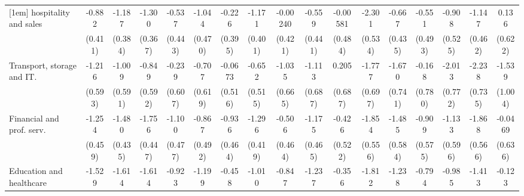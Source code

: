 {\begin{tabular}{l*{16}{c}}
[1em]
hospitality and sales&      -0.882\sym{*}  &      -1.187\sym{**} &      -1.300\sym{***}&      -0.537         &      -1.044\sym{*}  &      -0.226         &      -1.171\sym{**} &    -0.00240         &      -0.559         &    -0.00581         &      -2.301\sym{***}&      -0.667         &      -0.551         &      -0.908         &      -1.147\sym{*}  &       0.136         \\
                    &     (0.411)         &     (0.384)         &     (0.367)         &     (0.443)         &     (0.470)         &     (0.395)         &     (0.401)         &     (0.421)         &     (0.441)         &     (0.484)         &     (0.534)         &     (0.435)         &     (0.493)         &     (0.525)         &     (0.462)         &     (0.622)         \\
[1em]
Transport, storage and IT.&      -1.216\sym{*}  &      -1.009         &      -0.849         &      -0.239         &      -0.707         &     -0.0673         &      -0.652         &      -1.035         &      -1.113         &       0.205         &      -1.777\sym{*}  &      -1.670\sym{*}  &      -0.168         &      -2.013\sym{**} &      -2.238\sym{**} &      -1.539         \\
                    &     (0.593)         &     (0.591)         &     (0.592)         &     (0.607)         &     (0.619)         &     (0.516)         &     (0.515)         &     (0.665)         &     (0.687)         &     (0.687)         &     (0.697)         &     (0.741)         &     (0.780)         &     (0.772)         &     (0.735)         &     (1.004)         \\
[1em]
Financial and prof. serv.&      -1.254\sym{**} &      -1.480\sym{***}&      -1.756\sym{***}&      -1.100\sym{*}  &      -0.867         &      -0.936\sym{*}  &      -1.296\sym{**} &      -0.506         &      -1.175\sym{*}  &      -0.426         &      -1.854\sym{***}&      -1.485\sym{*}  &      -0.909         &      -1.133         &      -1.868\sym{***}&     -0.0469         \\
                    &     (0.459)         &     (0.435)         &     (0.447)         &     (0.477)         &     (0.492)         &     (0.464)         &     (0.419)         &     (0.464)         &     (0.465)         &     (0.522)         &     (0.556)         &     (0.584)         &     (0.575)         &     (0.596)         &     (0.566)         &     (0.636)         \\
[1em]
Education and healthcare&      -1.529\sym{***}&      -1.614\sym{***}&      -1.614\sym{***}&      -0.923\sym{*}  &      -1.199\sym{*}  &      -0.458         &      -1.010\sym{*}  &      -0.847         &      -1.237\sym{*}  &      -0.356         &      -1.812\sym{***}&      -1.238\sym{*}  &      -0.794         &      -0.985         &      -1.413\sym{**} &      -0.123         \\

\end{tabular}}
